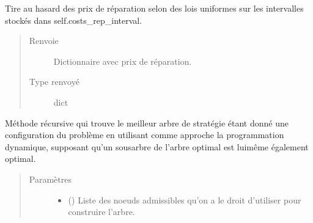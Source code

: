 \documentclass[letterpaper,10pt,french]{sphinxmanual}
\begin{document}
\begin{fulllineitems}
\begin{fulllineitems}
\end{fulllineitems}


\begin{fulllineitems}
\label{\detokenize{index:DecisionTheoreticTroubleshooting.TroubleShootingProblem.draw_true_prices}}
Tire au hasard des prix de réparation selon des lois uniformes sur les
intervalles stockés dans self.costs\_rep\_interval.
\begin{quote}\begin{description}
\item[{Renvoie}] \leavevmode
Dictionnaire avec prix de réparation.

\item[{Type renvoyé}] \leavevmode
dict

\end{description}\end{quote}

\end{fulllineitems}


\begin{fulllineitems}
\label{\detokenize{index:DecisionTheoreticTroubleshooting.TroubleShootingProblem.dynamic_programming_solver}}
Méthode récursive qui trouve le meilleur arbre de stratégie étant donné
une configuration du problème en utilisant comme approche la
programmation dynamique, supposant qu’un sous\sphinxhyphen{}arbre de l’arbre optimal
est lui\sphinxhyphen{}même également optimal.
\begin{quote}\begin{description}
\item[{Paramètres}] \leavevmode\begin{itemize}
\item {} 
 (\sphinxstyleliteralemphasis{\sphinxupquote{)}}\sphinxstyleliteralemphasis{\sphinxupquote{, }}) \textendash{} Liste des noeuds admissibles qu’on a le droit d’utiliser pour
construire l’arbre.


\end{itemize}
\end{description}
\end{quote}
\end{fulllineitems}
\end{fulllineitems}
\end{document}
